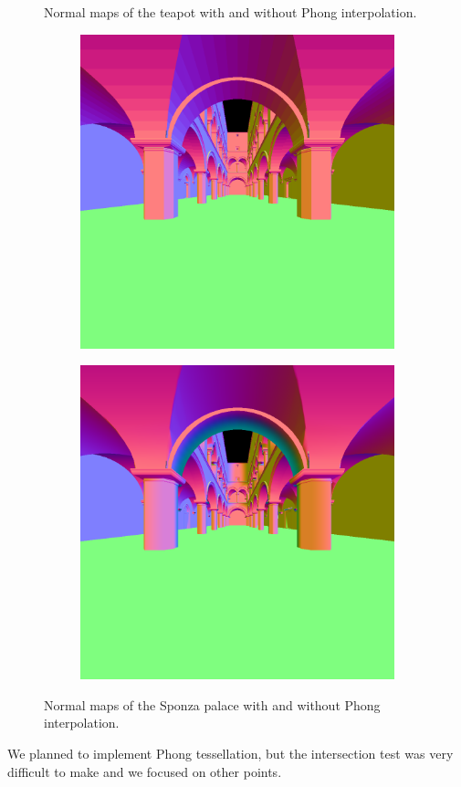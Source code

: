 \documentclass[acmsmall]{acmart}
\begin{document}
\begin{figure}[h]
    \caption{Normal maps of the teapot with and without Phong interpolation.}
    \label{fig:normalteapot}
\end{figure}

\begin{figure}[h]
    \centering
    
\begin{subfigure}{.5\textwidth}
  \centering
  \includegraphics[width=.9\linewidth]{img/nnsponza.png}
\end{subfigure}%
\begin{subfigure}{.5\textwidth}
  \centering
  \includegraphics[width=.9\linewidth]{img/nsponza.png}
\end{subfigure}    
    
    \caption{Normal maps of the Sponza palace with and without Phong interpolation.}
    \label{fig:normalsponza}
\end{figure}
We planned to implement Phong tessellation, but the intersection test was very difficult to make and we focused on other points.
\end{document}

